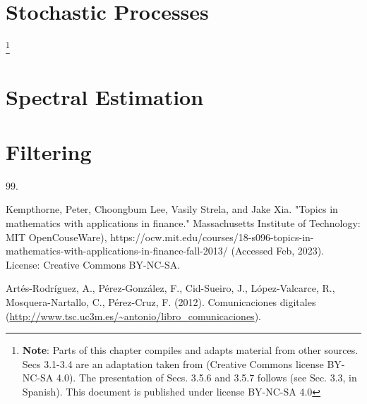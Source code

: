 \documentclass[graybox,envcountchap,sectrefs]{svmono_mod}
\begin{document}
\localtableofcontents



\chapter{Stochastic Processes}

\footnote{\textbf{Note}: Parts of this chapter compiles and adapts material from other sources. Secs 3.1-3.4 are an adaptation taken from \cite{MITcourse} (Creative Commons license BY-NC-SA 4.0). The presentation of Secs. 3.5.6 and 3.5.7 follows \cite{ComDig2007} (see Sec. 3.3, in Spanish). This document is published under license BY-NC-SA 4.0}

\localtableofcontents


\chapter{Spectral Estimation}

\localtableofcontents


\chapter{Filtering}

\localtableofcontents




%


\begin{thebibliography}{99.}

Kempthorne, Peter, Choongbum Lee, Vasily Strela, and Jake Xia. "Topics in mathematics with applications in finance." Massachusetts Institute of Technology: MIT OpenCouseWare), https://ocw.mit.edu/courses/18-s096-topics-in-mathematics-with-applications-in-finance-fall-2013/ (Accessed Feb, 2023). License: Creative Commons BY-NC-SA.

Artés-Rodríguez, A., Pérez-González, F., Cid-Sueiro, J., López-Valcarce, R., Mosquera-Nartallo, C., Pérez-Cruz, F. (2012). Comunicaciones digitales (\url{http://www.tsc.uc3m.es/~antonio/libro_comunicaciones}).

\end{thebibliography}


\backmatter
\printindex
\end{document}
